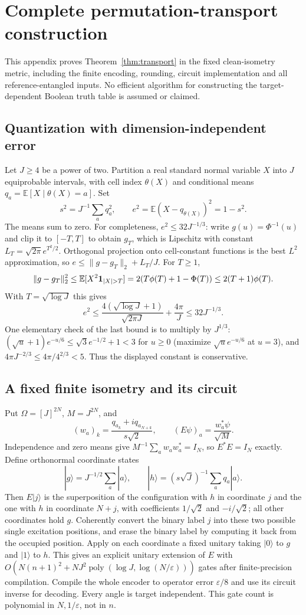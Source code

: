 \documentclass[11pt,a4paper]{article}
\theoremstyle{plain}
\theoremstyle{definition}
\theoremstyle{remark}
\DeclareMathOperator{\poly}{poly}
\newcommand{\E}{\mathbb E}
\begin{document}
\appendix
\section{Complete permutation-transport construction}\label{app:transport}

This appendix proves Theorem~\ref{thm:transport} in the fixed clean-isometry
metric, including the finite encoding, rounding, circuit implementation and
all reference-entangled inputs. No efficient algorithm for constructing the
target-dependent Boolean truth table is assumed or claimed.

\subsection{Quantization with dimension-independent error}
Let $J\ge4$ be a power of two. Partition a real standard normal variable $X$
into $J$ equiprobable intervals, with cell index $\theta(X)$ and conditional
means $q_a=\E[X\mid\theta(X)=a]$. Set
\[
 s^2=J^{-1}\sum_a q_a^2,\qquad e^2=\E(X-q_{\theta(X)})^2=1-s^2.
\]
The means sum to zero. For completeness, $e^2\le32J^{-1/3}$:
write $g(u)=\Phi^{-1}(u)$ and clip it to $[-T,T]$ to obtain $g_T$,
which is Lipschitz with constant $L_T=\sqrt{2\pi}e^{T^2/2}$.
Orthogonal projection onto cell-constant functions is the best $L^2$
approximation, so $e\le\|g-g_T\|_2+L_T/J$. For $T\ge1$,
\[
 \|g-g_T\|_2^2\le \E[X^2{\bf1}_{|X|>T}]
 =2(T\phi(T)+1-\Phi(T))\le2(T+1)\phi(T).
\]
With $T=\sqrt{\log J}$ this gives
\[
 e^2\le\frac{4(\sqrt{\log J}+1)}{\sqrt{2\pi J}}+\frac{4\pi}{J}
 \le32J^{-1/3}.
\]
One elementary check of the last bound is to multiply by $J^{1/3}$:
$(\sqrt u+1)e^{-u/6}\le\sqrt3 e^{-1/2}+1<3$ for $u\ge0$
(maximize $\sqrt u e^{-u/6}$ at $u=3$), and
$4\pi J^{-2/3}\le4\pi/4^{2/3}<5$.
Thus the displayed constant is conservative.

\subsection{A fixed finite isometry and its circuit}
Put $\Omega=[J]^{2N}$, $M=J^{2N}$, and
\[
 (w_a)_k=\frac{q_{a_k}+i q_{a_{N+k}}}{s\sqrt2},
 \qquad (E\psi)_a=\frac{w_a^*\psi}{\sqrt M}.
\]
Independence and zero means give $M^{-1}\sum_a w_aw_a^*=I_N$,
so $E^*E=I_N$ exactly. Define orthonormal coordinate states
\[
 |g\rangle=J^{-1/2}\sum_a|a\rangle,\qquad
 |h\rangle=(s\sqrt J)^{-1}\sum_a q_a|a\rangle.
\]
Then $E|j\rangle$ is the superposition of the configuration with $h$
in coordinate $j$ and the one with $h$ in coordinate $N+j$, with
coefficients $1/\sqrt2$ and $-i/\sqrt2$; all other coordinates hold $g$.
Coherently convert the binary label $j$ into these two possible single
excitation positions, and erase the binary label by computing it back
from the occupied position. Apply on each coordinate a fixed unitary
taking $|0\rangle$ to $g$ and $|1\rangle$ to $h$.
This gives an explicit unitary extension of $E$ with
$O(N(n+1)^2+NJ^2\poly(\log J,\log(N/\varepsilon)))$ gates after
finite-precision compilation. Compile the whole encoder to operator
error $\varepsilon/8$ and use its circuit inverse for decoding.
Every angle is target independent. This gate count is polynomial in
$N,1/\varepsilon$, not in $n$.
\end{document}
